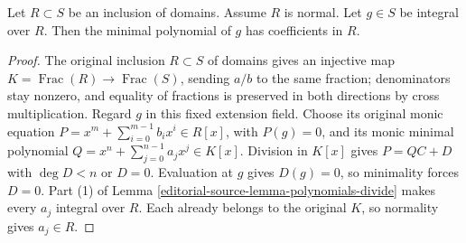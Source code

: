 \begin{lemma}
\label{editorial-source-lemma-minimal-polynomial-normal-domain}
Let $R \subset S$ be an inclusion of domains.
Assume $R$ is normal. Let $g \in S$ be integral
over $R$. Then the minimal polynomial of $g$
has coefficients in $R$.
\end{lemma}

\begin{proof}
The original inclusion $R\subset S$ of domains gives an
injective map $K=\operatorname{Frac}(R)\to\operatorname{Frac}(S)$,
sending $a/b$ to the same fraction; denominators stay nonzero,
and equality of fractions is preserved in both directions by
cross multiplication. Regard $g$ in this fixed extension field.
Choose its original monic equation
$P=x^m+\sum_{i=0}^{m-1}b_ix^i\in R[x]$, with $P(g)=0$,
and its monic minimal polynomial
$Q=x^n+\sum_{j=0}^{n-1}a_jx^j\in K[x]$.
Division in $K[x]$ gives $P=QC+D$ with $\deg D<n$ or $D=0$.
Evaluation at $g$ gives $D(g)=0$, so minimality forces $D=0$.
Part (1) of Lemma \ref{editorial-source-lemma-polynomials-divide} makes every
$a_j$ integral over $R$. Each already belongs to the original
$K$, so normality gives $a_j\in R$.
\end{proof}